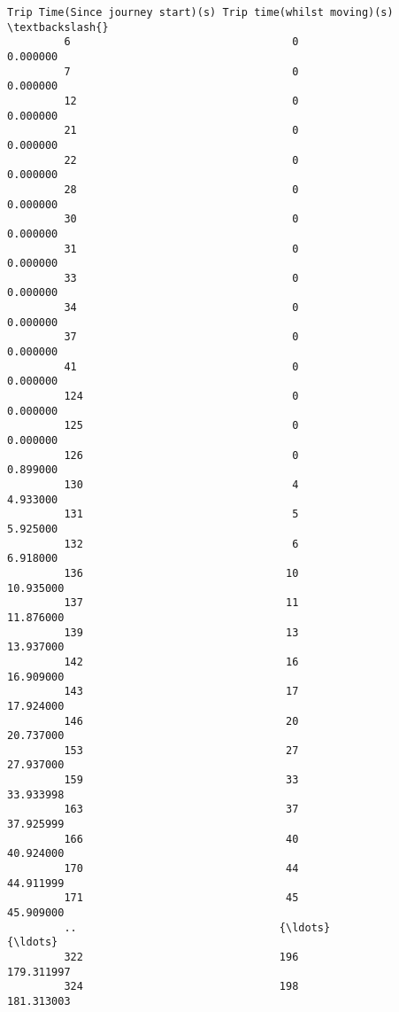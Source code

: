 \documentclass[11pt]{article}
\begin{document}
\begin{Verbatim}[commandchars=\\\{\}]
             Trip Time(Since journey start)(s) Trip time(whilst moving)(s)  \textbackslash{}
         6                                   0                    0.000000   
         7                                   0                    0.000000   
         12                                  0                    0.000000   
         21                                  0                    0.000000   
         22                                  0                    0.000000   
         28                                  0                    0.000000   
         30                                  0                    0.000000   
         31                                  0                    0.000000   
         33                                  0                    0.000000   
         34                                  0                    0.000000   
         37                                  0                    0.000000   
         41                                  0                    0.000000   
         124                                 0                    0.000000   
         125                                 0                    0.000000   
         126                                 0                    0.899000   
         130                                 4                    4.933000   
         131                                 5                    5.925000   
         132                                 6                    6.918000   
         136                                10                   10.935000   
         137                                11                   11.876000   
         139                                13                   13.937000   
         142                                16                   16.909000   
         143                                17                   17.924000   
         146                                20                   20.737000   
         153                                27                   27.937000   
         159                                33                   33.933998   
         163                                37                   37.925999   
         166                                40                   40.924000   
         170                                44                   44.911999   
         171                                45                   45.909000   
         ..                                {\ldots}                         {\ldots}   
         322                               196                  179.311997   
         324                               198                  181.313003   

\end{Verbatim}
\end{document}
